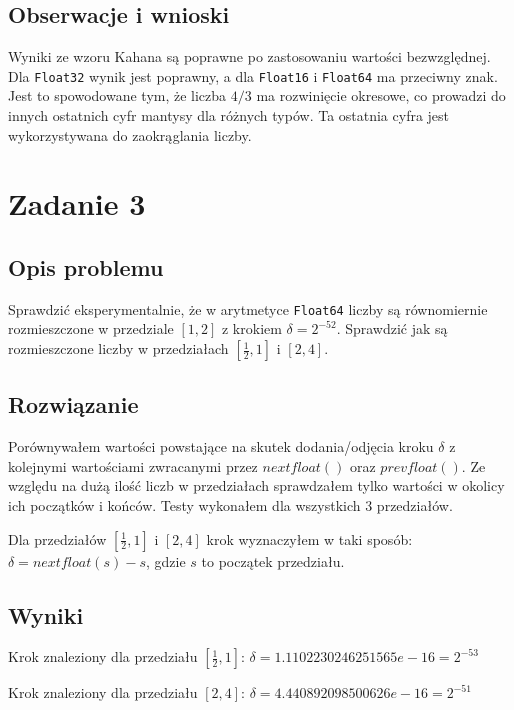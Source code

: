\documentclass{article}
\begin{document}
\subsection{Obserwacje i wnioski}
Wyniki ze wzoru Kahana są poprawne po zastosowaniu wartości bezwzględnej. Dla \texttt{Float32} wynik jest poprawny, a
dla \texttt{Float16} i \texttt{Float64} ma przeciwny znak. Jest to spowodowane tym, że liczba $4/3$ ma rozwinięcie
okresowe, co prowadzi do innych ostatnich cyfr mantysy dla różnych typów. Ta ostatnia cyfra jest wykorzystywana do
zaokrąglania liczby.

\section{Zadanie 3}
\subsection{Opis problemu}
Sprawdzić eksperymentalnie, że w arytmetyce \texttt{Float64} liczby są równomiernie rozmieszczone w przedziale $[1, 2]$
z krokiem $\delta = 2^{-52}$. Sprawdzić jak są rozmieszczone liczby w przedziałach $[\frac{1}{2}, 1]$ i $[2, 4]$.

\subsection{Rozwiązanie}
Porównywałem wartości powstające na skutek dodania/odjęcia kroku $\delta$ z kolejnymi wartościami zwracanymi przez
$nextfloat()$ oraz $prevfloat()$. Ze względu na dużą ilość liczb w przedziałach sprawdzałem tylko wartości w okolicy
ich początków i końców. Testy wykonałem dla wszystkich 3 przedziałów.

Dla przedziałów $[\frac{1}{2}, 1]$ i $[2, 4]$ krok wyznaczyłem
w taki sposób: $\delta = nextfloat(s) - s$, gdzie $s$ to początek przedziału.

\subsection{Wyniki}
\begin{description}
    \item Krok znaleziony dla przedziału $[\frac{1}{2}, 1]$: $\delta = 1.1102230246251565e-16 = 2^{-53}$
    \item Krok znaleziony dla przedziału $[2, 4]$: $\delta = 4.440892098500626e-16 = 2^{-51}$
\end{description}
\end{document}
